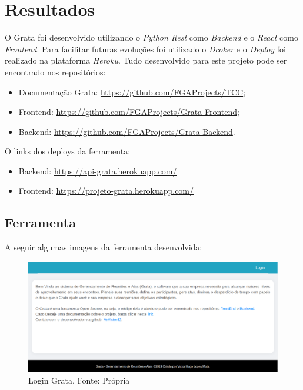 \chapter[Resultados]{Resultados}
\label{cp:resultados}

O Grata foi desenvolvido utilizando o \textit{Python Rest} como \textit{Backend} e o \textit{React} como \textit{Frontend}. Para facilitar futuras evoluções foi utilizado o \textit{Dcoker} e o \textit{Deploy} foi realizado na plataforma \textit{Heroku}. Tudo desenvolvido para este projeto pode ser encontrado nos repositórios:
\begin{itemize}
    \item Documentação Grata: \url{https://github.com/FGAProjects/TCC};
    \item Frontend: \url{https://github.com/FGAProjects/Grata-Frontend};
    \item Backend: \url{https://github.com/FGAProjects/Grata-Backend}.
\end{itemize}

O links dos deploys da ferramenta:
\begin{itemize}
    \item Backend: \url{https://api-grata.herokuapp.com/}
    \item Frontend: \url{https://projeto-grata.herokuapp.com/}
\end{itemize}

\section{Ferramenta}

A seguir algumas imagens da ferramenta desenvolvida:

\begin{figure}[H]
    \centering
    \includegraphics[width=1.0\textwidth]{figuras/grata_login.png}
    \caption{Login Grata. Fonte: Própria}
    \label{img:grata_login}
\end{figure}


